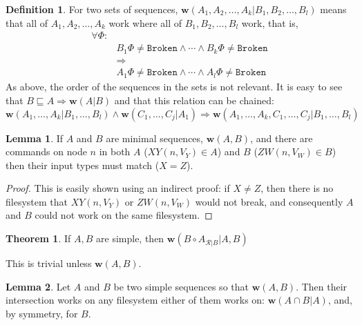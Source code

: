 \documentclass[12pt]{article}
\newcommand{\fsbroken}{\mathtt{Broken}} %
\newcommand{\FS}{\Phi} %
\newcommand{\fscommand}[2]{{#1#2}}
\newcommand{\cxy}{\fscommand{X}{Y}}
\newcommand{\czw}{\fscommand{Z}{W}}
\newcommand{\cc}{\circ} %
\newcommand{\eqext}{\sqsubseteq}
\newcommand{\works}[1]{{\mathbf{w}}({#1})}
\newcommand{\worksc}[2]{{\mathbf{w}}({#1}|{#2})}
\newcommand{\ordered}[1]{#1}
\newcommand{\recchar}[3]{{#1}^{#3}_{\mathcal{R}|{#2}}}
\newcommand{\reca}{\recchar{A}{B}{}} %
\theoremstyle{definition}
\newtheorem{mydef}{Definition}
\newtheorem{mylem}{Lemma}
\newtheorem{myth}{Theorem}
\begin{document}
\begin{mydef}
For two sets of sequences, $\worksc{A_1,A_2,\ldots,A_k}{B_1,B_2,\ldots,B_l}$ means that 
all of $A_1,A_2,\ldots,A_k$ work where all of $B_1,B_2,\ldots,B_l$ work,
that is,
\begin{align*}
\forall \FS:&\\ 
&B_1\FS\neq\fsbroken \wedge \cdots \wedge B_k\FS\neq\fsbroken\\
&\Rightarrow\\
&A_1\FS\neq\fsbroken \wedge \cdots \wedge A_l\FS\neq\fsbroken
\end{align*}
As above, the order of the sequences in the sets is not relevant.
It is easy to see that 
$B\eqext A \Rightarrow \worksc{A}{B}$
and that this relation can be chained:
$ \worksc{A_1,\ldots,A_k}{B_1,\ldots,B_l} \wedge \worksc{C_1,\ldots,C_j}{A_1} \Rightarrow \worksc{A_1,\ldots,A_k,C_1,\ldots,C_j}{B_1,\ldots,B_l} $
\end{mydef}

\begin{mylem}\label{worksinputmatch}
If $A$ and $B$ are minimal sequences, $\works{A,B}$,
and there are commands on node $n$ in both $A$ ($\cxy(n, V_Y)\in A$) and $B$ ($\czw(n, V_W)\in B$)
then their input types must match ($X=Z$).
\end{mylem}
\begin{proof}
This is easily shown using an indirect proof: if $X\neq Z$, then there is no filesystem that
$\cxy(n, V_Y)$ or $\czw(n, V_W)$ would not break, and consequently $A$ and $B$ could not work on the same filesystem.
\end{proof}













\begin{myth}
If $A, B$ are simple, then $\worksc{B\cc \reca}{A,B}$
\end{myth}

This is trivial unless $\works{A,B}$.

\begin{mylem}
Let $A$ and $B$ be two simple sequences so that $\works{A, B}$.
Then their intersection works on any filesystem
either of them works on:
$\worksc{\ordered{A\cap B}}{A}$, and, by symmetry, for $B$.
\end{mylem}
\end{document}
